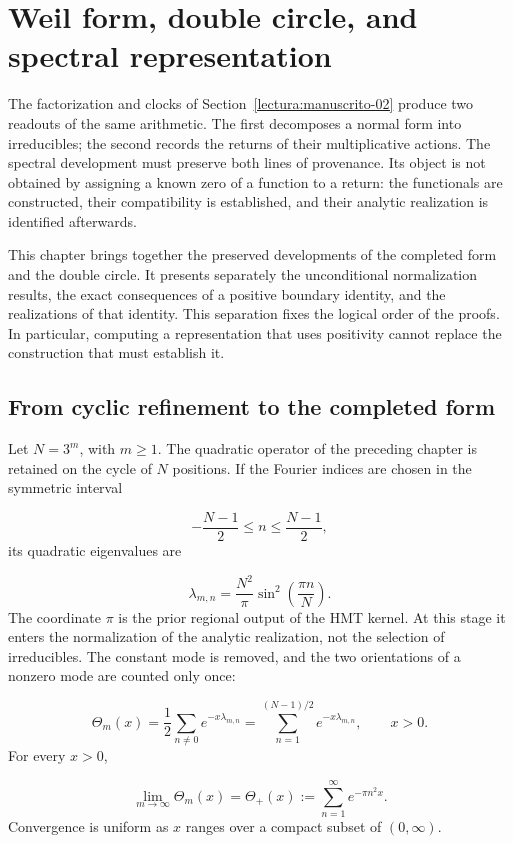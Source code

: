\section{Weil form, double circle, and spectral representation}
\label{lectura:manuscrito-03}
The factorization and clocks of Section~\ref{lectura:manuscrito-02} produce two readouts of the same arithmetic. The first decomposes a normal form into irreducibles; the second records the returns of their multiplicative actions. The spectral development must preserve both lines of provenance. Its object is not obtained by assigning a known zero of a function to a return: the functionals are constructed, their compatibility is established, and their analytic realization is identified afterwards.

This chapter brings together the preserved developments of the completed form and the double circle. It presents separately the unconditional normalization results, the exact consequences of a positive boundary identity, and the realizations of that identity. This separation fixes the logical order of the proofs. In particular, computing a representation that uses positivity cannot replace the construction that must establish it.

\subsection{From cyclic refinement to the completed form}
Let \(N=3^m\), with \(m\geq1\). The quadratic operator of the preceding chapter is retained on the cycle of \(N\) positions. If the Fourier indices are chosen in the symmetric interval

\[
-\frac{N-1}{2}\leq n\leq\frac{N-1}{2},
\]
its quadratic eigenvalues are

\[
\lambda_{m,n}=\frac{N^2}{\pi}\sin^2\!\left(\frac{\pi n}{N}\right).
\]
The coordinate \(\pi\) is the prior regional output of the HMT kernel. At this stage it enters the normalization of the analytic realization, not the selection of irreducibles. The constant mode is removed, and the two orientations of a nonzero mode are counted only once:

\[
\Theta_m(x)=\frac12\sum_{n\neq0}e^{-x\lambda_{m,n}}
=\sum_{n=1}^{(N-1)/2}e^{-x\lambda_{m,n}},\qquad x>0.
\]
For every \(x>0\),

\[
\lim_{m\to\infty}\Theta_m(x)
=\Theta_+(x):=\sum_{n=1}^{\infty}e^{-\pi n^2x}.
\]
Convergence is uniform as \(x\) ranges over a compact subset of \((0,\infty)\).

